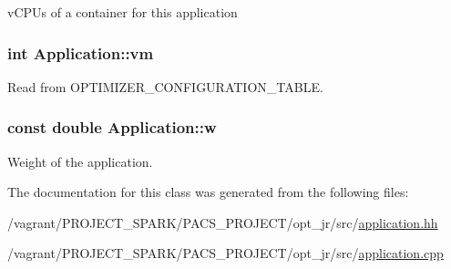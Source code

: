 v\-C\-P\-Us of a container for this application 

\hypertarget{classApplication_a0a3fe386eb8244e536bc5297709d1269}{
\subsubsection[{vm}]{\setlength{\rightskip}{0pt plus 5cm}int Application\-::vm\hspace{0.3cm}{\ttfamily [private]}}}\label{classApplication_a0a3fe386eb8244e536bc5297709d1269}


Read from O\-P\-T\-I\-M\-I\-Z\-E\-R\-\_\-\-C\-O\-N\-F\-I\-G\-U\-R\-A\-T\-I\-O\-N\-\_\-\-T\-A\-B\-L\-E. 

\hypertarget{classApplication_a89e171cf287b09ce4b37dd94c0d61e2b}{
\subsubsection[{w}]{\setlength{\rightskip}{0pt plus 5cm}const double Application\-::w\hspace{0.3cm}{\ttfamily [private]}}}\label{classApplication_a89e171cf287b09ce4b37dd94c0d61e2b}


Weight of the application. 



The documentation for this class was generated from the following files\-:\begin{DoxyCompactItemize}
\item 
/vagrant/\-P\-R\-O\-J\-E\-C\-T\-\_\-\-S\-P\-A\-R\-K/\-P\-A\-C\-S\-\_\-\-P\-R\-O\-J\-E\-C\-T/opt\-\_\-jr/src/\hyperlink{application_8hh}{application.\-hh}\item 
/vagrant/\-P\-R\-O\-J\-E\-C\-T\-\_\-\-S\-P\-A\-R\-K/\-P\-A\-C\-S\-\_\-\-P\-R\-O\-J\-E\-C\-T/opt\-\_\-jr/src/\hyperlink{application_8cpp}{application.\-cpp}\end{DoxyCompactItemize}
